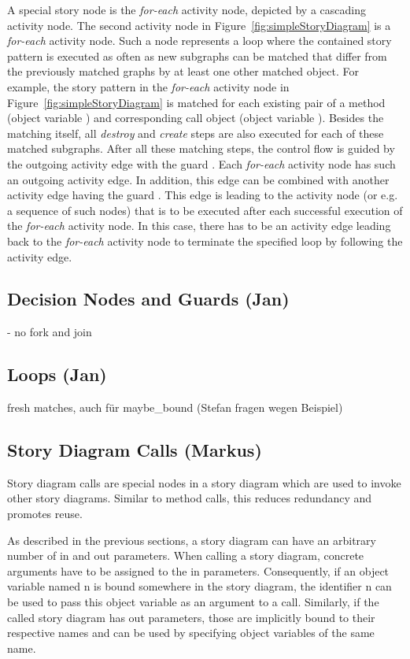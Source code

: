 A special story node is the \emph{for-each} activity node, depicted by a cascading activity node.
The second activity node in Figure~\ref{fig:simpleStoryDiagram} is a \emph{for-each} activity node.
Such a node represents a loop where the contained story pattern is executed as often as new subgraphs can be matched
that differ from the previously matched graphs by at least one other matched object.
For example, the story pattern in the \emph{for-each} activity node in Figure~\ref{fig:simpleStoryDiagram}
is matched for each existing pair of a method (object variable ) and corresponding call object (object variable ).
Besides the matching itself, all \emph{destroy} and \emph{create} steps are also executed for each of these matched subgraphs.
After all these matching steps, the control flow is guided by the outgoing activity edge with the guard .
Each \emph{for-each} activity node has such an outgoing activity edge.
In addition, this edge can be combined with another activity edge having the guard .
This edge is leading to the activity node (or e.g. a sequence of such nodes)
that is to be executed after each successful execution of the \emph{for-each} activity node.
In this case, there has to be an activity edge leading back to the \emph{for-each} activity node
to terminate the specified loop by following the  activity edge.



\subsection{Decision Nodes and Guards (Jan)}
- no fork and join

\subsection{Loops (Jan)}
fresh matches, auch für maybe_bound (Stefan fragen wegen Beispiel)

\subsection{Story Diagram Calls (Markus)}

Story diagram calls are special nodes in a story diagram which are used to invoke other story diagrams. Similar to method calls, this reduces redundancy and promotes reuse.

As described in the previous sections, a story diagram can have an arbitrary number of in and out parameters. When calling a story diagram, concrete arguments have to be assigned to the in parameters. Consequently, if an object variable named n is bound somewhere in the story diagram, the identifier n can be used to pass this object variable as an argument to a call. Similarly, if the called story diagram has out parameters, those are implicitly bound to their respective names and can be used by specifying object variables of the same name.

